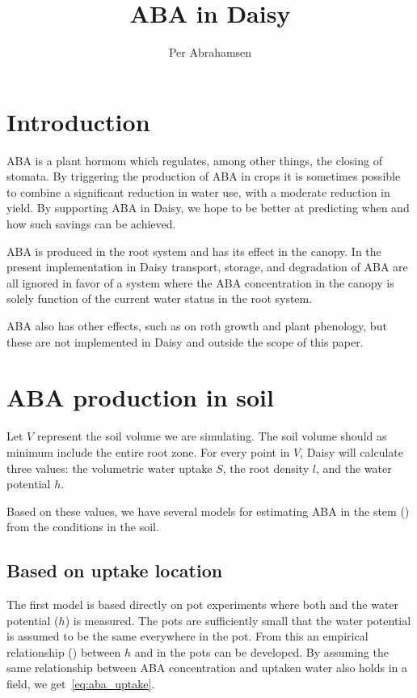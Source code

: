 \documentclass[a4paper,11pt,twoside]{article}
\newcommand{\aba}[1]{\text{\textsc{aba}$_\text{\textsc{#1}}$}}
\begin{document}
\title{ABA in Daisy}
\author{Per Abrahamsen}
\maketitle

\section{Introduction}

ABA is a plant hormom which regulates, among other things, the closing
of stomata.  By triggering the production of ABA in crops it is
sometimes possible to combine a significant reduction in water use,
with a moderate reduction in yield.  By supporting ABA in Daisy, we
hope to be better at predicting when and how such savings can be
achieved.

ABA is produced in the root system and has its effect in the canopy.
In the present implementation in Daisy transport, storage, and
degradation of ABA are all ignored in favor of a system where the ABA
concentration in the canopy is solely function of the current water
status in the root system.

ABA also has other effects, such as on roth growth and plant
phenology, but these are not implemented in Daisy and outside the
scope of this paper.

\section{ABA production in soil}

Let $V$ represent the soil volume we are simulating.  The soil volume
should as minimum include the entire root zone.  For every point in
$V$, Daisy will calculate three values: the volumetric water uptake
$S$, the root density $l$, and the water potential $h$.

Based on these values, we have several models for estimating ABA in
the stem (\aba{xylem}) from the conditions in the soil.

\subsection{Based on uptake location}

The first model is based directly on pot experiments where both
\aba{xylem} and the water potential ($h$) is measured.  The pots are
sufficiently small that the water potential is assumed to be the same
everywhere in the pot.  From this an empirical relationship
(\aba{uptake}) between $h$ and \aba{xylem} in the pots can be
developed.  By assuming the same relationship between ABA
concentration and uptaken water also holds in a field, we
get~\eqref{eq:aba_uptake}.
\end{document}
